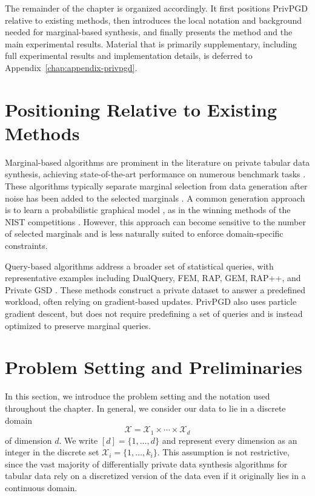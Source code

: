 The remainder of the chapter is organized accordingly. It first positions PrivPGD relative to existing methods, then introduces the local notation and background needed for marginal-based synthesis, and finally presents the method and the main experimental results. Material that is primarily supplementary, including full experimental results and implementation details, is deferred to Appendix~\ref{chap:appendix-privpgd}.

\section{Positioning Relative to Existing Methods}

Marginal-based algorithms are prominent in the literature on private tabular data synthesis, achieving state-of-the-art performance on numerous benchmark tasks \citep{mst,tao2021benchmarking,hu2023sok}. These algorithms typically separate marginal selection \citep{cai2021data,mst,aim} from data generation after noise has been added to the selected marginals \citep{zhang2017privbayes,mckenna2019graphical,li2021dpsyn,zhang2021privsyn}. A common generation approach is to learn a probabilistic graphical model \citep{mckenna2019graphical}, as in the winning methods of the NIST competitions \citep{cai2021data,mst,aim}. However, this approach can become sensitive to the number of selected marginals and is less naturally suited to enforce domain-specific constraints.

Query-based algorithms address a broader set of statistical queries, with representative examples including DualQuery, FEM, RAP, GEM, RAP++, and Private GSD \citep{gaboardi14,vietri2020new,aydore2021differentially,liu2021iterative,vietri2022private,pmlr-v202-liu23ag}. These methods construct a private dataset to answer a predefined workload, often relying on gradient-based updates. PrivPGD also uses particle gradient descent, but does not require predefining a set of queries and is instead optimized to preserve marginal queries.

\section{Problem Setting and Preliminaries}

In this section, we introduce the problem setting and the notation used throughout the chapter. In general, we consider our data to lie in a discrete domain
\[
  \mathcal{X} = \mathcal{X}_1 \times \cdots \times \mathcal{X}_d
\]
of dimension \(d\). We write \([d] = \{1,\dots,d\}\) and represent every dimension as an integer in the discrete set \(\mathcal{X}_i = \{1,\dots,k_i\}\). This assumption is not restrictive, since the vast majority of differentially private data synthesis algorithms for tabular data rely on a discretized version of the data even if it originally lies in a continuous domain.

